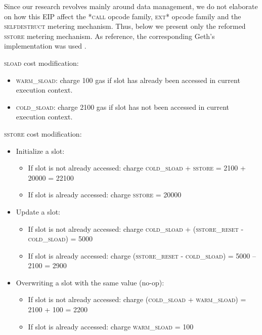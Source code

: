 Since our research revolves mainly around data management, we do not elaborate on how this EIP affect the \textsc{*call} opcode family, \textsc{ext*} opcode family and the \textsc{selfdestruct} metering mechanism. Thus, below we present only the reformed \textsc{sstore} metering mechanism. As reference, the corresponding Geth’s implementation was used  \citep{ethereum_2022}.

\vspace{0.2cm}
\noindent
\textsc{sload} cost modification:
   \begin{itemize}[topsep=0pt, itemsep=0pt]
     \item  \textsc{warm\_sload}: charge 100 gas if slot has already been accessed in current execution context.
     \item  \textsc{cold\_sload}: charge 2100 gas if slot has not been accessed in current execution context.
   \end{itemize}
   
\vspace{0.2cm}
\noindent
 \textsc{sstore} cost modification:
   \begin{itemize}[topsep=0pt, itemsep=0pt]
     \item  Initialize a slot:
     \begin{itemize}[topsep=0pt, itemsep=0pt]
        \item If slot is not already accessed: charge \textsc{cold\_sload} + \textsc{sstore} = 2100 + 20000 = 22100
        \item If slot is already accessed: charge \textsc{sstore} = 20000
     \end{itemize}
   \end{itemize}
   
   \begin{itemize}[topsep=0pt, itemsep=0pt]
     \item  Update a slot: 
     \begin{itemize}[topsep=0pt, itemsep=0pt]
        \item If slot is not already accessed: charge \textsc{cold\_sload} + \textsc{(sstore\_reset - cold\_sload)} = 5000
        \item If slot is already accessed: charge \textsc{(sstore\_reset - cold\_sload)} = 5000 – 2100 = 2900
     \end{itemize}
   \end{itemize}
   
   \begin{itemize}[topsep=0pt, itemsep=0pt]
     \item  Overwriting a slot with the same value (no-op):
     \begin{itemize}[topsep=0pt, itemsep=0pt]
        \item If slot is not already accessed: charge \textsc{(cold\_sload + warm\_sload)} = 2100 + 100 = 2200
        \item If slot is already accessed: charge \textsc{warm\_sload} = 100 
     \end{itemize}
   \end{itemize}


